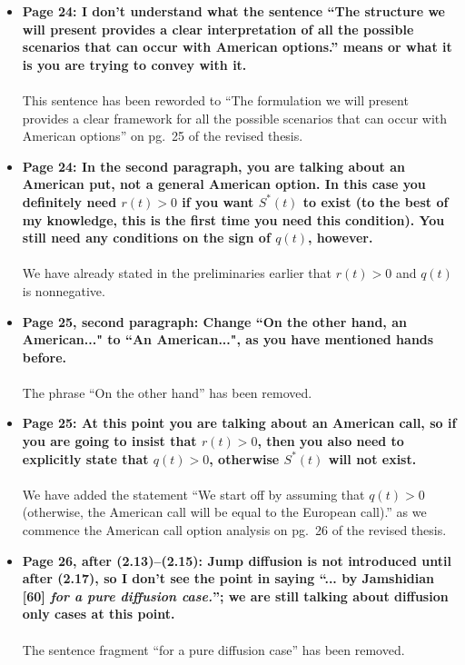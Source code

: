 \documentclass{article}
\begin{document}
\begin{enumerate}
\begin{itemize}
			\item{\textbf{Page 24: I don't understand what the sentence ``The structure we will present provides a clear interpretation of all the possible scenarios that can occur with American options.'' means or what it is you are trying to convey with it.\\\\}}
			This sentence has been reworded to ``The formulation we will present provides a clear framework for all the possible scenarios that can occur with American options'' on pg.~25 of the revised thesis.
			
			\item{\textbf{Page 24: In the second paragraph, you are talking about an American put, not a general American option. In this case you definitely need $r(t) > 0$ if you want $S^*(t)$ to exist (to the best of my knowledge, this is the first time you need this condition). You still need any conditions on the sign of $q(t)$, however.\\\\}}
			We have already stated in the preliminaries earlier that $r(t) > 0$ and $q(t)$ is nonnegative.
			
			\item{\textbf{Page 25, second paragraph: Change ``On the other hand, an American..." to ``An American...", as you have mentioned hands before.
			\\\\}}
			The phrase ``On the other hand'' has been removed.
			\item{\textbf{Page 25: At this point you are talking about an American call, so if you are going to insist that $r(t) > 0$, then you also need to explicitly state that $q(t) > 0$, otherwise $S^*(t)$ will not exist.
			\\\\}}
			We have added the statement ``We start off by assuming that $q(t) > 0$ (otherwise, the American call will be equal to the European call).'' as we commence the American call option analysis on pg.~26 of the revised thesis.
			
			\item{\textbf{Page 26, after (2.13)--(2.15): Jump diffusion is not introduced until after (2.17), so I don't see the point in saying ``... by Jamshidian [60] \emph{for a pure diffusion case.}''; we are still talking about diffusion only cases at this point.
			\\\\}}
			The sentence fragment ``for a pure diffusion case'' has been removed.
			

\end{itemize}
\end{enumerate}
\end{document}
